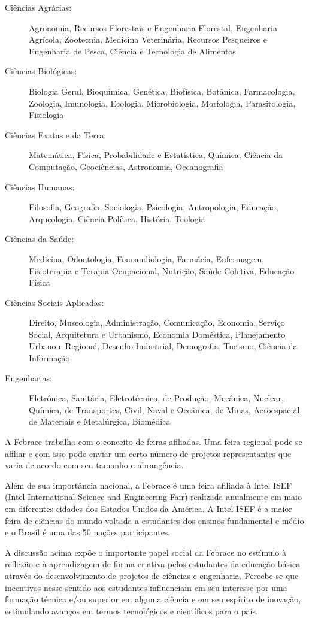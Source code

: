 \begin{description}
    \item[Ciências Agrárias:] 
        Agronomia, Recursos Florestais e Engenharia Florestal, Engenharia Agrícola, Zootecnia, Medicina Veterinária, Recursos Pesqueiros e Engenharia de Pesca, Ciência e Tecnologia de Alimentos
    \item[Ciências Biológicas:] 
        Biologia Geral, Bioquímica, Genética, Biofísica, Botânica, Farmacologia, Zoologia, Imunologia, Ecologia, Microbiologia, Morfologia, Parasitologia, Fisiologia 	 
    \item[Ciências Exatas e da Terra:] 
        Matemática, Física, Probabilidade e Estatística, Química, Ciência da Computação, Geociências, Astronomia, Oceanografia 
    \item[Ciências Humanas:] 
        Filosofia, Geografia, Sociologia, Psicologia, Antropologia, Educação, Arqueologia, Ciência Política, História, Teologia 
    \item[Ciências da Saúde:] 
        Medicina, Odontologia, Fonoaudiologia, Farmácia, Enfermagem, Fisioterapia e Terapia Ocupacional, Nutrição, Saúde Coletiva, Educação Física
    \item[Ciências Sociais Aplicadas:] 
        Direito, Museologia, Administração, Comunicação, Economia, Serviço Social, Arquitetura e Urbanismo, Economia Doméstica, Planejamento Urbano e Regional, Desenho Industrial, Demografia, Turismo, Ciência da Informação  	 
    \item[Engenharias:] 
        Eletrônica, Sanitária, Eletrotécnica, de Produção, Mecânica, Nuclear, Química, de Transportes, Civil, Naval e Oceânica, de Minas, Aeroespacial, de Materiais e Metalúrgica, Biomédica 
\end{description}

A Febrace trabalha com o conceito de feiras afiliadas. Uma feira regional pode se afiliar e com isso pode enviar um certo número de projetos representantes que varia de acordo com seu tamanho e abrangência.

Além de sua importância nacional, a Febrace é uma feira afiliada à Intel ISEF (Intel International Science and Engineering Fair) realizada anualmente em maio em diferentes cidades dos Estados Unidos da América. A Intel ISEF é a maior feira de ciências do mundo voltada a estudantes dos ensinos fundamental e médio e o Brasil é uma das 50 nações participantes.

A discussão acima expõe o importante papel social da Febrace no estímulo à reflexão e à aprendizagem de forma criativa pelos estudantes da educação básica através do desenvolvimento de projetos de ciências e engenharia. Percebe-se que incentivos nesse sentido aos estudantes influenciam em seu interesse por uma formação técnica e/ou superior em alguma ciência e em seu espírito de inovação, estimulando avanços em termos tecnológicos e científicos para o país.

